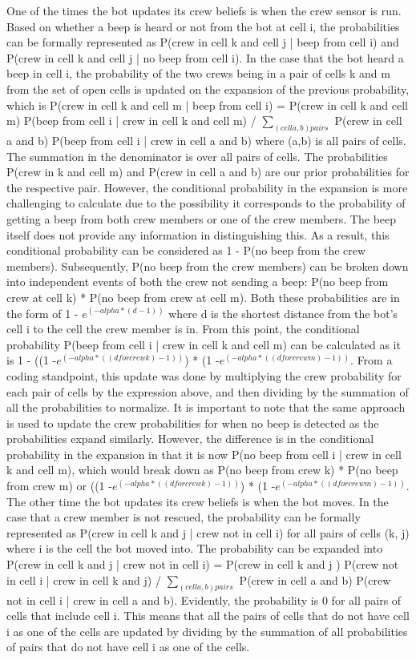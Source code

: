 \documentclass[11pt]{article}
\begin{document}
One of the times the bot updates its crew beliefs is when the crew sensor is run. Based on whether a beep is heard or not from the bot at cell i, the probabilities can be formally represented as P(crew in cell k and cell j | beep from cell i) and P(crew in cell k and cell j | no beep from cell i). In the case that the bot heard a beep in cell i, the probability of the two crews being in a pair of cells k and m from the set of open cells is updated on the expansion of the previous probability, which is P(crew in cell k and cell m | beep from cell i) = P(crew in cell k and cell m) P(beep from cell i | crew in cell k and cell m)  / $\sum_{(cell a, b) pairs}$ P(crew in cell a and b) P(beep from cell i | crew in cell a and b) where (a,b) is all pairs of cells. The summation in the denominator is over all pairs of cells. The probabilities P(crew in k and cell m) and P(crew in cell a and b) are our prior probabilities for the respective pair. However, the conditional probability in the expansion is more challenging to calculate due to the possibility it corresponds to the probability of getting a beep from both crew members or one of the crew members. The beep itself does not provide any information in distinguishing this. As a result, this conditional probability can be considered as 1 - P(no beep from the crew members). Subsequently, P(no beep from the crew members) can be broken down into independent events of both the crew not sending a beep: P(no beep from crew at cell k) * P(no beep from crew at cell m). Both these probabilities are in the form of 1 - $e^{(-alpha * (d-1))}$ where d is the shortest distance from the bot's cell i to the cell the crew member is in. From this point, the conditional probability P(beep from cell i | crew in cell k and cell m) can be calculated as it is 1 - ((1 -$e^{(-alpha * ((d for crew k)-1))}$) * (1 -$e^{(-alpha * ((d for crew m)-1))}$. From a coding standpoint, this update was done by multiplying the crew probability for each pair of cells by the expression above, and then dividing by the summation of all the probabilities to normalize. It is important to note that the same approach is used to update the crew probabilities for when no beep is detected as the probabilities expand similarly. However, the difference is in the conditional probability in the expansion in that it is now P(no beep from cell i | crew in cell k and cell m), which would break down as P(no beep from crew k) * P(no beep from crew m) or ((1 -$e^{(-alpha * ((d for crew k)-1))}$) * (1 -$e^{(-alpha * ((d for crew m)-1))}$. 
\medskip
The other time the bot updates its crew beliefs is when the bot moves. In the case that a crew member is not rescued, the probability can be formally represented as P(crew in cell k and j | crew not in cell i) for all pairs of cells (k, j) where i is the cell the bot moved into. The probability can be expanded into P(crew in cell k and j | crew not in cell i) = P(crew in cell k and j ) P(crew not in cell i | crew in cell k and j) / $\sum_{(cell a, b) pairs}$ P(crew in cell a and b) P(crew not in cell i | crew in cell a and b). Evidently, the probability is 0 for all pairs of cells that include cell i. This means that all the pairs of cells that do not have cell i as one of the cells are updated by dividing by the summation of all probabilities of pairs that do not have cell i as one of the cells.
\end{document}
